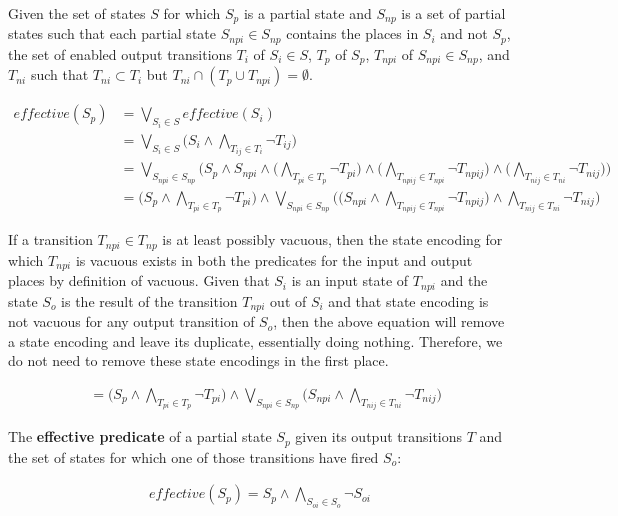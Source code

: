 \begin{lemma}
Given the set of states $S$ for which $S_p$ is a partial state and $S_{np}$ is a set of partial states such that each partial state $S_{npi} \in S_{np}$ contains the places in $S_i$ and not $S_p$, the set of enabled output transitions $T_i$ of $S_i \in S$, $T_p$ of $S_p$, $T_{npi}$ of $S_{npi} \in S_{np}$, and $T_{ni}$ such that $T_{ni} \subset T_i$ but $T_{ni} \cap (T_p \cup T_{npi}) = \emptyset$.

\begin{align}
effective(S_p) &= \bigvee_{S_i \in S} effective(S_i) \\
&= \bigvee_{S_i \in S} \bigg( S_i \wedge \bigwedge_{T_{ij} \in T_i} \neg T_{ij} \bigg) \\
&= \bigvee_{S_{npi} \in S_{np}} \bigg( S_p \wedge S_{npi} \wedge \bigg( \bigwedge_{T_{pi} \in T_p} \neg T_{pi} \bigg) \wedge \bigg( \bigwedge_{T_{npij} \in T_{npi}} \neg T_{npij} \bigg) \wedge \bigg( \bigwedge_{T_{nij} \in T_{ni}} \neg T_{nij} \bigg) \bigg) \\
&= \bigg( S_p \wedge \bigwedge_{T_{pi} \in T_p} \neg T_{pi} \bigg) \wedge \bigvee_{S_{npi} \in S_{np}} \bigg( \bigg( S_{npi} \wedge \bigwedge_{T_{npij} \in T_{npi}} \neg T_{npij} \bigg) \wedge \bigwedge_{T_{nij} \in T_{ni}} \neg T_{nij} \bigg)
\end{align}

If a transition $T_{npi} \in T_{np}$ is at least possibly vacuous, then the state encoding for which $T_{npi}$ is vacuous exists in both the predicates for the input and output places by definition of vacuous. Given that $S_i$ is an input state of $T_{npi}$ and the state $S_o$ is the result of the transition $T_{npi}$ out of $S_i$ and that state encoding is not vacuous for any output transition of $S_o$, then the above equation will remove a state encoding and leave its duplicate, essentially doing nothing. Therefore, we do not need to remove these state encodings in the first place.

\begin{align}
&= \bigg( S_p \wedge \bigwedge_{T_{pi} \in T_p} \neg T_{pi} \bigg) \wedge \bigvee_{S_{npi} \in S_{np}} \bigg( S_{npi} \wedge \bigwedge_{T_{nij} \in T_{ni}} \neg T_{nij} \bigg)
\end{align}
\end{lemma}

\begin{definition}
The \textbf{effective predicate} of a partial state $S_p$ given its output transitions $T$ and the set of states for which one of those transitions have fired $S_o$:

\begin{align}
effective(S_p) = S_p \wedge \bigwedge_{S_{oi} \in S_o} \neg S_{oi}
\end{align}



\end{definition}

